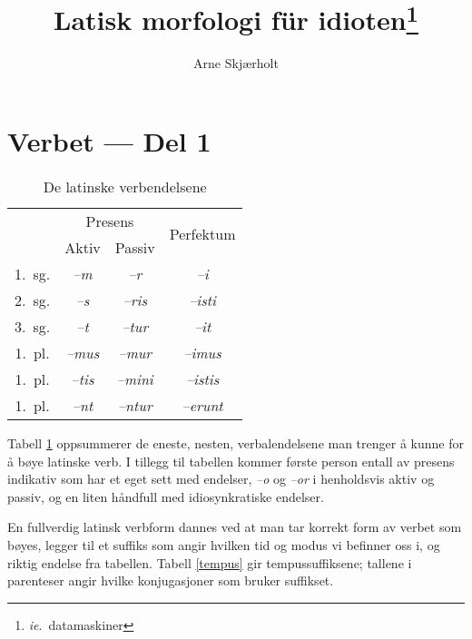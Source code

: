 \documentclass[a4paper]{article}
\title{Latisk morfologi f\"ur idioten\footnote{\emph{ie}.~datamaskiner}}
\author{Arne Skj\ae{}rholt}
\begin{document}
\maketitle

\section{Verbet --- Del 1}

\begin{table}[hp]
\begin{center}
\begin{tabular}{|c|c|c|c|}
    \hline
       & \multicolumn{2}{c|}{Presens} & \multirow{2}{*}{Perfektum} \\ \cline{2-3}
       & Aktiv & Passiv & \\
    \hline
1.~sg. & \emph{--m}   & \emph{--r}    & \emph{--i}       \\
2.~sg. & \emph{--s}   & \emph{--ris}  & \emph{--isti}    \\
3.~sg. & \emph{--t}   & \emph{--tur}  & \emph{--it}      \\
1.~pl. & \emph{--mus} & \emph{--mur}  & \emph{--imus}    \\
1.~pl. & \emph{--tis} & \emph{--mini} & \emph{--istis}   \\
1.~pl. & \emph{--nt}  & \emph{--ntur} & \emph{--erunt}   \\
    \hline
\end{tabular}
\caption{De latinske verbendelsene}
\label{endelser}
\end{center}
\end{table}

Tabell \ref{endelser} oppsummerer de eneste, nesten, verbalendelsene man
trenger \aa{} kunne for \aa{} b\o{}ye latinske verb. I tillegg til tabellen
kommer f\o{}rste person entall av presens indikativ som har et eget sett med
endelser, \emph{--o} og \emph{--or} i henholdsvis aktiv og passiv, og en liten
h\aa{}ndfull med idiosynkratiske endelser.

En fullverdig latinsk verbform dannes ved at man tar korrekt form av verbet
som b\o{}yes, legger til et suffiks som angir hvilken tid og modus vi befinner
oss i, og riktig endelse fra tabellen. Tabell \ref{tempus} gir
tempussuffiksene; tallene i parenteser angir hvilke konjugasjoner som bruker
suffikset.
\end{document}
